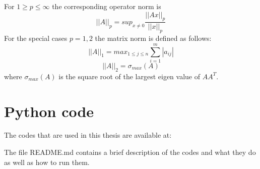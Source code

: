 For $ 1 \geq p \leq \infty$ the corresponding operator norm is \begin{equation} ||A||_p = sup_{x \neq 0} \frac{||Ax||_p}{||x||_p} \end{equation} 
For the special cases $ p = 1,2$ the matrix norm is defined as follows: \begin{equation}
||A||_1 = max_{1\leq j \leq n} \sum_{i =1}^{m} |a_{ij} |
\end{equation}
\begin{equation}
||A||_2 = \sigma_{max} (A) 
\end{equation} where $\sigma_{max} (A)$ is the square root of the largest eigen value of $ AA^{T} $.

\section{Python code}

The codes that are used in this thesis are available at: 


The file README.md contains a brief description of the codes and what they do as well as how to
run them.



